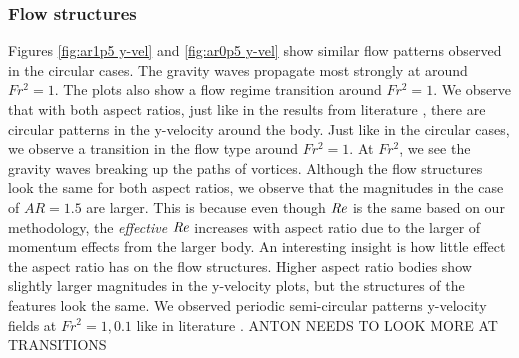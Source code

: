 \subsubsection{Flow structures}
Figures \ref{fig:ar1p5 y-vel} and \ref{fig:ar0p5 y-vel} show similar flow patterns observed in the circular cases. The gravity waves propagate most strongly at around $Fr^2 = 1$. The plots also show a flow regime transition around $Fr^2 = 1$. We observe that with both aspect ratios, just like in the results from literature \cite{ortiz-tarin_stratified_2019}, there are circular patterns in the y-velocity around the body. Just like in the circular cases, we observe a transition in the flow type around $Fr^2 = 1$. At $Fr^2$, we see the gravity waves breaking up the paths of vortices.  Although the flow structures look the same for both aspect ratios, we observe that the magnitudes in the case of $AR = 1.5$ are larger. This is because even though $\mathit{Re}$ is the same based on our methodology, the \textit{effective} $\mathit{Re}$ increases with aspect ratio due to the larger of momentum effects from the larger body. An interesting insight is how little effect the aspect ratio has on the flow structures. Higher aspect ratio bodies show slightly larger magnitudes in the y-velocity plots, but the structures of the features look the same. We observed periodic semi-circular patterns y-velocity fields at $Fr^2 = 1, 0.1$ like in literature \cite{ortiz-tarin_stratified_2019}. ANTON NEEDS TO LOOK MORE AT TRANSITIONS
